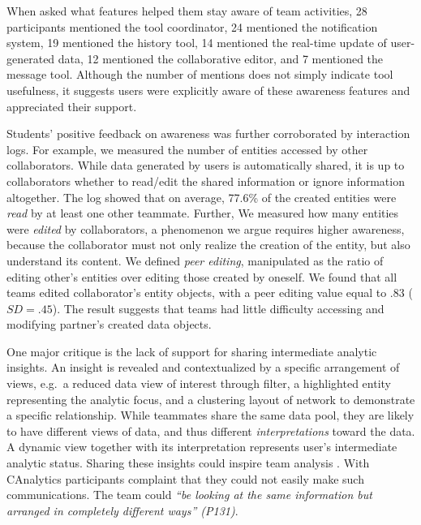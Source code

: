 When asked what features helped them stay aware of team activities, 28
participants mentioned the tool coordinator, 24 mentioned the
notification system, 19 mentioned the history tool, 14 mentioned the
real-time update of user-generated data, 12 mentioned the collaborative
editor, and 7 mentioned the message tool. Although the number of mentions
does not simply indicate tool usefulness, it suggests users were explicitly aware of these awareness features and appreciated their support.


Students' positive feedback on awareness was further corroborated by
interaction logs. For example, we measured the number of entities
accessed by other collaborators. While data
generated by users is automatically shared, it is up to collaborators
whether to read/edit the shared information or ignore information altogether.
The log showed that on average, 77.6\% of the created entities
were \emph{read} by at least one other teammate. Further, We measured how
many entities were \emph{edited} by collaborators, a phenomenon we argue
requires higher awareness, because the collaborator must not only realize
the creation of the entity, but also understand its content. We
defined \emph{peer editing}, manipulated as the ratio of editing other's
entities over editing those created by oneself. We found that all teams
edited collaborator's entity objects, with a peer editing value equal
to .83 ($SD=.45$). The result suggests that teams had little difficulty
accessing and modifying partner's created data objects.

One major critique is the lack of support for sharing intermediate analytic
insights. An insight is revealed and contextualized by a specific arrangement of views, e.g.~a reduced data view of interest through filter, a highlighted entity representing the analytic focus, and a clustering layout of network to demonstrate a specific relationship. While teammates share the same data pool, they are likely to have different views of data, and thus different \emph{interpretations}
toward the data. A dynamic view together with its interpretation represents
user's intermediate analytic status. Sharing these insights could inspire team analysis \cite{Gotz2009d}. With CAnalytics
participants complaint that they could not easily make such communications. The team could \emph{``be
looking at the same information but arranged in completely different
ways'' (P131)}.

